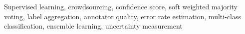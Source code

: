 Supervised learning, crowdsourcing, confidence score, soft weighted majority voting, label aggregation, annotator quality, error rate estimation, multi-class classification, ensemble learning, uncertainty measurement
